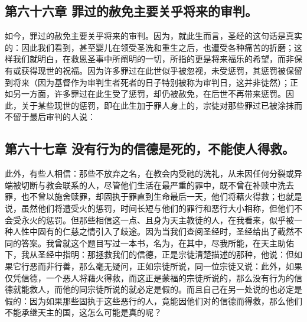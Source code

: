 
\subsection{第六十六章 罪过的赦免主要关乎将来的审判。}

如今，罪过的赦免主要关乎将来的审判。因为，就此生而言，圣经的这句话是真实的：因此我们看到，甚至婴儿在领受圣洗和重生之后，也遭受各种痛苦的折磨；这样我们就明白，在救恩圣事中所阐明的一切，所指的更是将来福乐的希望，而非保有或获得现世的祝福。因为许多罪过在此世似乎被忽视，未受惩罚，其惩罚被保留到将来（因为基督作为审判生者死者的日子特别被称为审判日，这并非徒然）；正如另一方面，许多罪过在此生受了惩罚，却仍被赦免，在后世不再带来惩罚。因此，关于某些现世的惩罚，即在此生加于罪人身上的，宗徒对那些罪过已被涂抹而不留于最后审判的人说：\par


\subsection{第六十七章 没有行为的信德是死的，不能使人得救。}

此外，有些人相信：那些不放弃之名，在教会内受祂的洗礼，从未因任何分裂或异端被切断与教会联系的人，尽管他们生活在最严重的罪中，既不曾在补赎中洗去罪，也不曾以施舍赎罪，却固执于罪直到生命最后一天，他们将藉火得救；也就是说，虽然他们将遭受火的惩罚，时间长短与他们的罪行和恶行大小相称，但他们不会受永火的惩罚。但那些相信这一点、且身为天主教徒的人，在我看来，似乎被一种人性中固有的仁慈之情引入了歧途。因为当我们查阅圣经时，圣经给出了截然不同的答案。我曾就这个题目写过一本书，名为，在其中，尽我所能，在天主助佑下，我从圣经中指明：那拯救我们的信德，正是宗徒清楚描述的那种，他说：但如果它行恶而非行善，那么毫无疑问，正如宗徒所说，同一位宗徒又说：此外，如果仅凭信德，一个恶人将藉火得救，而这正是蒙福的宗徒所说的，那么没有行为的信德就能救人，而他的同宗徒所说的就必定是假的。而且自己在另一处说的也必定是假的：因为如果那些固执于这些恶行的人，竟能因他们对的信德而得救，那么他们不能承继天主的国，这怎么可能是真的呢？\par

